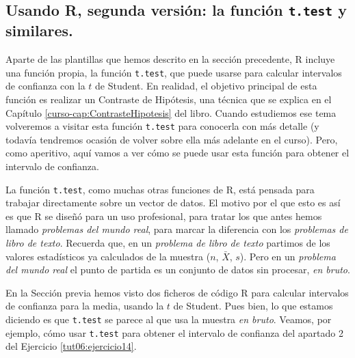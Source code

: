 \documentclass[10pt,a4paper]{article}\usepackage[]{graphicx}\usepackage[]{color}
\begin{document}
\subsection{Usando R, segunda versión: la función {\tt t.test} y similares.}
\label{tut06:subsec:IntConfMediaUsandoTConTtest}

Aparte de las plantillas que hemos descrito en la sección precedente, R incluye una función propia, la función {\tt t.test}, que puede usarse para calcular intervalos de confianza con la $t$ de Student.
En realidad, el objetivo principal de esta función es realizar un Contraste de Hipótesis, una técnica que se explica en el Capítulo \ref{curso-cap:ContrasteHipotesis} del libro. Cuando estudiemos ese tema volveremos a visitar esta función {\tt t.test} para conocerla con más detalle (y todavía tendremos ocasión de volver sobre ella más adelante en el curso). Pero, como aperitivo, aquí vamos a ver cómo se puede usar esta función para obtener el intervalo de confianza.

La función {\tt t.test}, como muchas otras funciones de R, está pensada para trabajar directamente sobre un vector de datos. El motivo por el que esto es así es que R se diseñó para un uso profesional, para tratar los que antes hemos llamado {\em problemas del mundo real}, para marcar la diferencia con los {\em problemas de libro de texto}. Recuerda que, en un {\em problema de libro de texto} partimos de los valores estadísticos ya calculados de la muestra ($n$, $\bar X$, $s$).  Pero en un {\em problema del mundo real} el punto de partida es un conjunto de datos sin procesar, {\em en bruto}.

En la Sección previa hemos visto dos ficheros de código R para calcular intervalos de confianza para la media, usando la $t$ de Student. Pues bien, lo que estamos diciendo es que {\tt t.test} se parece al que usa la muestra {\em en bruto}. Veamos, por ejemplo, cómo usar {\tt t.test} para obtener el intervalo de confianza del apartado 2 del Ejercicio \ref{tut06:ejercicio14}.
\end{document}

